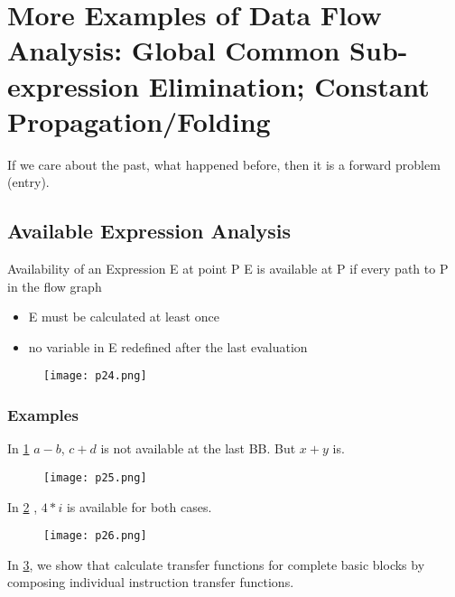 \section{More Examples of Data Flow Analysis: Global Common Sub-expression Elimination; Constant Propagation/Folding}

If we care about the past, what happened before, then it is a forward problem (entry). 


\subsection{Available Expression Analysis}


\begin{definition}{Availability of an Expression E at point P}
E is available at P if every path to P in the flow graph
\begin{itemize}
    \item E must be calculated at least once
    \item no variable in E redefined after the last evaluation

\end{itemize}
\end{definition}


\begin{figure}[h]
    \centering
    \texttt{[image: p24.png]}
    \caption{}
    \label{fig:p24}
\end{figure}


\subsubsection{Examples}



In \ref{fig:p24} $a-b$, $c+d$ is not available at the last BB. But $x+y$ is.


\begin{figure}[h]
    \centering
    \texttt{[image: p25.png]}
    \caption{}
    \label{fig:p25}
\end{figure}


In \ref{fig:p25} , $4*i$ is available for both cases.



\begin{figure}[h]
    \centering
    \texttt{[image: p26.png]}
    \caption{}
    \label{fig:p26}
\end{figure}


In \ref{fig:p26}, we show that calculate transfer functions for complete basic blocks by composing individual instruction transfer functions.


